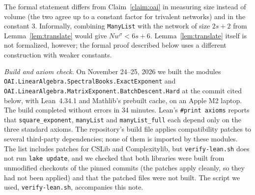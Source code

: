 \documentclass[11pt]{article}
\theoremstyle{definition}
\begin{document}
The formal statement differs from Claim~\ref{claim:oai} in measuring size instead of volume (the two agree up to a constant factor for trivalent networks) and in the constant $3$. Informally, combining \texttt{ManyList} with the network of size $2s+2$ from Lemma~\ref{lem:translate} would give $N w^{\sigma} < 6s+6$. Lemma~\ref{lem:translate} itself is not formalized, however; the formal proof described below uses a different construction with weaker constants.

\emph{Build and axiom check.} On November 24--25, 2026 we built the modules \texttt{OAI.\allowbreak LinearAlgebra.\allowbreak SpectralBooks.\allowbreak ExactExponent} and \texttt{OAI.\allowbreak LinearAlgebra.\allowbreak MatrixExponent.\allowbreak BatchDescent.\allowbreak Hard} at the commit cited below, with Lean~4.34.1 and Mathlib's prebuilt cache, on an Apple M2 laptop. The build completed without errors in 34 minutes. Lean's \texttt{\#print axioms} reports that \texttt{square\_exponent}, \texttt{manyList} and \texttt{manyList\_full} each depend only on the three standard axioms. The repository's build file applies compatibility patches to several third-party dependencies; none of them is imported by these modules. The list includes patches for CSLib and Complexitylib, but \texttt{verify-lean.sh} does not run \texttt{lake update}, and we checked that both libraries were built from unmodified checkouts of the pinned commits (the patches apply cleanly, so they had not been applied) and that the patched files were not built. The script we used, \texttt{verify-lean.sh}, accompanies this note.
\end{document}
